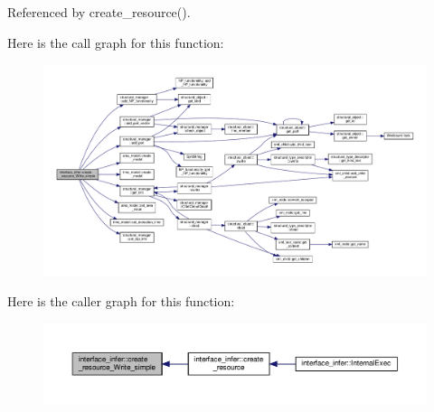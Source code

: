 Referenced by create\+\_\+resource().

Here is the call graph for this function\+:
\nopagebreak
\begin{figure}[H]
\begin{center}
\leavevmode
\includegraphics[width=350pt]{d9/d8a/classinterface__infer_a939d3b1a8c42718def0faaad4e09624f_cgraph}
\end{center}
\end{figure}
Here is the caller graph for this function\+:
\nopagebreak
\begin{figure}[H]
\begin{center}
\leavevmode
\includegraphics[width=350pt]{d9/d8a/classinterface__infer_a939d3b1a8c42718def0faaad4e09624f_icgraph}
\end{center}
\end{figure}
\mbox{\label{classinterface__infer_a7a20911ad7bad6cbb4afee947f26131e}} 
